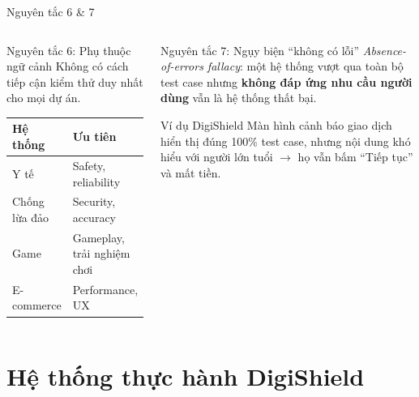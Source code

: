 \documentclass[aspectratio=169,12pt]{beamer}
\begin{document}
\begin{frame}{Nguyên tắc 6 \& 7}
  \begin{columns}
    \begin{block}{Nguyên tắc 6: Phụ thuộc ngữ cảnh}
      Không có cách tiếp cận kiểm thử duy nhất cho mọi dự án.

      \vspace{0.3em}
      \begin{tabularx}{\columnwidth}{l>{\raggedright\arraybackslash}X}
        \small\textbf{Hệ thống} & \small\textbf{Ưu tiên} \\
        \midrule
        \small Y tế & \small Safety, reliability \\
        \small Chống lừa đảo & \small Security, accuracy \\
        \small Game & \small Gameplay, trải nghiệm chơi \\
        \small E-commerce & \small Performance, UX \\
      \end{tabularx}
    \end{block}

    \begin{block}{Nguyên tắc 7: Ngụy biện ``không có lỗi''}
      \textit{Absence-of-errors fallacy}: một hệ thống vượt qua toàn bộ test case
      nhưng \textbf{không đáp ứng nhu cầu người dùng} vẫn là hệ thống thất bại.

      \vspace{0.3em}
      \begin{exampleblock}{\small Ví dụ DigiShield}
        \small Màn hình cảnh báo giao dịch hiển thị đúng 100\% test case,
        nhưng nội dung khó hiểu với người lớn tuổi $\to$ họ vẫn bấm
        ``Tiếp tục'' và mất tiền.
      \end{exampleblock}
    \end{block}
  \end{columns}
\end{frame}

\section{Hệ thống thực hành DigiShield}
\end{document}
